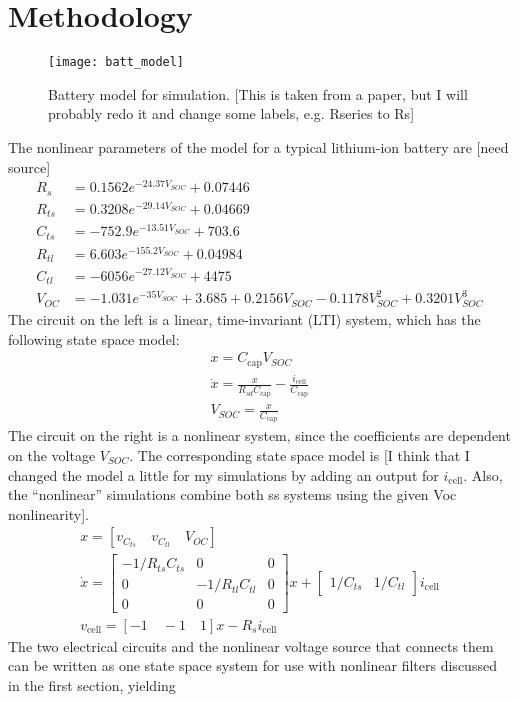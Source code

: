 \chapter{Methodology}


\begin{figure}
\centering
\texttt{[image: batt\_model]}
\caption{Battery model for simulation. [This is taken from a paper, but I will probably redo it and change some labels, e.g. Rseries to Rs]}
\label{fig:batt_model}
\end{figure}

The nonlinear parameters of the model for a typical lithium-ion battery are [need source]
\begin{align}
	R_s &= 0.1562 e^{-24.37 V_{SOC}} + 0.07446 \\
	R_{ts} &= 0.3208 e^{-29.14 V_{SOC}} + 0.04669 \\
	C_{ts} &= -752.9 e^{-13.51 V_{SOC}} + 703.6 \\
	R_{tl} &= 6.603 e^{-155.2 V_{SOC}} + 0.04984 \\
	C_{tl} &= -6056 e^{-27.12 V_{SOC}} + 4475 \\
	V_{OC} &= -1.031 e^{-35 V_{SOC}} + 3.685 + 0.2156 V_{SOC} - 0.1178 V_{SOC}^2 + 0.3201 V_{SOC}^3
\end{align}
The circuit on the left is a linear, time-invariant (LTI) system, which has the following state space model:
\begin{gather}
    x = C_\text{cap} V_{SOC} \\
    \dot{x} = \frac{x}{R_{sd} C_\text{cap}} - \frac{i_\text{cell}}{C_\text{cap}} \\
    V_{SOC} = \frac{x}{C_\text{cap}}
\end{gather}
The circuit on the right is a nonlinear system, since the coefficients are dependent on the voltage $V_{SOC}$. The corresponding state space model is [I think that I changed the model a little for my simulations by adding an output for $i_\text{cell}$. Also, the ``nonlinear'' simulations combine both ss systems using the given Voc nonlinearity].
\begin{gather}
    x = [v_{C_{ts}} \quad v_{C_{tl}} \quad V_{OC}] \\
	\dot{x} = \begin{bmatrix}
		-1/R_{ts}C_{ts} & 0 & 0 \\
		0 & -1/R_{tl}C_{tl} & 0 \\
		0 & 0 & 0
		\end{bmatrix} x 
		+ \begin{bmatrix} 1/C_{ts} & 1/C_{tl} \end{bmatrix} i_\text{cell} \\
	v_\text{cell} = [-1 \quad -1 \quad 1] x - R_s i_\text{cell}
\end{gather}
The two electrical circuits and the nonlinear voltage source that connects them can be written as one state space system for use with nonlinear filters discussed in the first section, yielding

